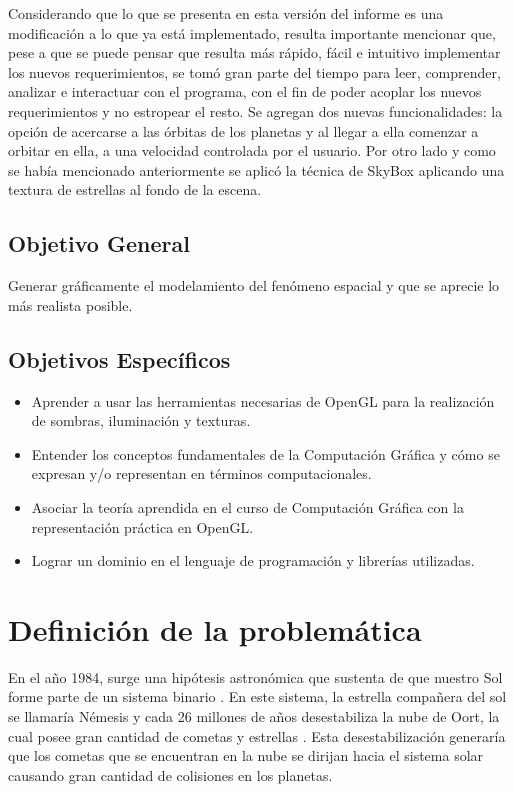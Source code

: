 \documentclass[journal]{IEEEtran}
\begin{document}
	Considerando que lo que se presenta en esta versión del informe es una modificación a lo que ya está implementado, resulta importante mencionar que, pese a que se puede pensar que resulta más rápido, fácil e intuitivo implementar los nuevos requerimientos, se tomó gran parte del tiempo para leer, comprender, analizar e interactuar con el programa, con el fin de poder acoplar los nuevos requerimientos y no estropear el resto. Se agregan dos nuevas funcionalidades: la opción de acercarse a las órbitas de los planetas y al llegar a ella comenzar a orbitar en ella, a una velocidad controlada por el usuario. Por otro lado y como se había mencionado anteriormente se aplicó la técnica de SkyBox aplicando una textura de estrellas al fondo de la escena.

\subsection{Objetivo General}
	Generar gráficamente el modelamiento del fenómeno espacial y que se aprecie lo más realista posible. 

\subsection{Objetivos Específicos}
	\begin{itemize}
		\item Aprender a usar las herramientas necesarias de OpenGL para la realización de sombras, iluminación 
		y texturas.
		\item Entender los conceptos fundamentales de la Computación Gráfica y cómo se expresan y/o representan 
		en términos computacionales.
		\item Asociar la teoría aprendida en el curso de Computación Gráfica con la 
		representación práctica en OpenGL.
		\item Lograr un dominio en el lenguaje  de programación y librerías utilizadas.	
	\end{itemize}
	
\section{Definición de la problemática}

En el año 1984, surge una hipótesis astronómica que sustenta de que nuestro Sol forme parte de un sistema binario \cite{RAMuller}. En este sistema, la estrella compañera del sol se llamaría Némesis y cada 26 millones de años desestabiliza la nube de Oort, la cual posee gran cantidad de cometas y estrellas \cite{astronomia}. Esta desestabilización generaría que los cometas que se encuentran en la nube se dirijan hacia el sistema solar causando gran cantidad de colisiones en los planetas. \\
\end{document}
